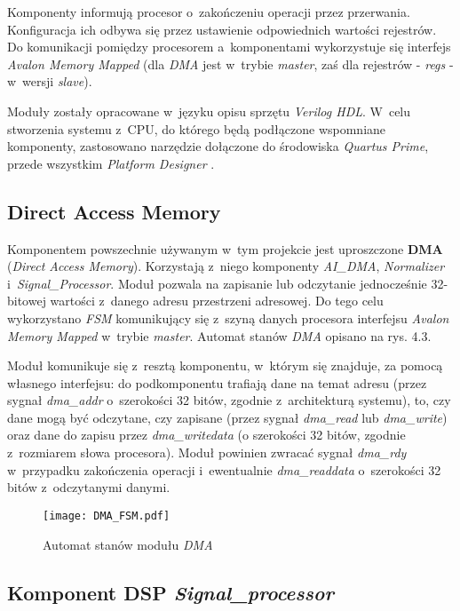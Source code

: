 Komponenty informują procesor o~zakończeniu operacji przez przerwania. Konfiguracja ich odbywa się przez ustawienie odpowiednich wartości rejestrów. Do komunikacji pomiędzy procesorem a~komponentami wykorzystuje się interfejs \textit{Avalon Memory Mapped} \cite{Intel:AVMM} (dla \textit{DMA} jest w~trybie \textit{master}, zaś dla rejestrów - \textit{regs} - w~wersji \textit{slave}).

Moduły zostały opracowane w~języku opisu sprzętu \textit{Verilog HDL}. W~celu stworzenia systemu z~CPU, do którego będą podłączone wspomniane komponenty, zastosowano narzędzie dołączone do środowiska \textit{Quartus Prime}, przede wszystkim \textit{Platform Designer} \cite{PDes}.

\subsection{Direct Access Memory}

Komponentem powszechnie używanym w~tym projekcie jest uproszczone \textbf{DMA} (\textit{Direct Access Memory}). Korzystają z~niego komponenty \textit{AI\_DMA}, \textit{Normalizer} i~\textit{Signal\_Processor}. Moduł pozwala na zapisanie lub odczytanie jednocześnie 32-bitowej wartości z~danego adresu przestrzeni adresowej. Do tego celu wykorzystano \textit{FSM} komunikujący się z~szyną danych procesora interfejsu \textit{Avalon Memory Mapped} w~trybie \textit{master}. Automat stanów \textit{DMA} opisano na rys. 4.3.

Moduł komunikuje się z~resztą komponentu, w~którym się znajduje, za pomocą własnego interfejsu: do podkomponentu trafiają dane na temat adresu (przez sygnał \textit{dma\_addr} o~szerokości 32 bitów, zgodnie z~architekturą systemu), to, czy dane mogą być odczytane, czy zapisane (przez sygnał \textit{dma\_read} lub \textit{dma\_write}) oraz dane do zapisu przez \textit{dma\_writedata} (o szerokości 32 bitów, zgodnie z~rozmiarem słowa procesora). Moduł powinien zwracać sygnał \textit{dma\_rdy} w~przypadku zakończenia operacji i~ewentualnie \textit{dma\_readdata} o~szerokości 32 bitów z~odczytanymi danymi.

\begin{figure}[h]
	\centering
	\texttt{[image: DMA\_FSM.pdf]}
	\caption{Automat stanów modułu \textit{DMA}}
\end{figure}
\FloatBarrier %

\subsection{Komponent DSP \textit{Signal\_processor}}
